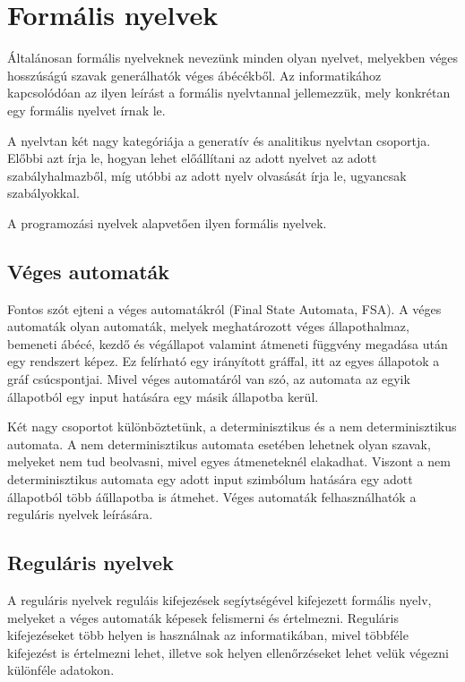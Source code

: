 
\section{Formális nyelvek}

Általánosan formális nyelveknek nevezünk minden olyan nyelvet, melyekben véges hosszúságú szavak generálhatók véges ábécékből. Az informatikához kapcsolódóan az ilyen leírást a formális nyelvtannal jellemezzük, mely konkrétan egy formális nyelvet írnak le.

A nyelvtan két nagy kategóriája a generatív és analitikus nyelvtan csoportja. Előbbi azt írja le, hogyan lehet előállítani az adott nyelvet az adott szabályhalmazből, míg utóbbi az adott nyelv olvasását írja le, ugyancsak szabályokkal.

A programozási nyelvek alapvetően ilyen formális nyelvek.

\subsection{Véges automaták}

Fontos szót ejteni a véges automatákról (Final State Automata, FSA). A véges automaták olyan automaták, melyek meghatározott véges állapothalmaz, bemeneti ábécé, kezdő és végállapot valamint átmeneti függvény megadása után egy rendszert képez. Ez felírható egy irányított gráffal, itt az egyes állapotok a gráf csúcspontjai. Mivel véges automatáról van szó, az automata az egyik állapotból egy input hatására egy másik állapotba kerül.

Két nagy csoportot különböztetünk, a determinisztikus és a nem determinisztikus automata. A nem determinisztikus automata esetében lehetnek olyan szavak, melyeket nem tud beolvasni, mivel egyes átmeneteknél elakadhat. Viszont a nem determinisztikus automata egy adott input szimbólum hatására egy adott állapotból több áűllapotba is átmehet. Véges automaták felhasználhatók a reguláris nyelvek leírására.

\subsection{Reguláris nyelvek}

A reguláris nyelvek reguláis kifejezések segíytségével kifejezett formális nyelv, melyeket a véges automaták képesek felismerni és értelmezni. Reguláris kifejezéseket több helyen is használnak az informatikában, mivel többféle kifejezést is értelmezni lehet, illetve sok helyen ellenőrzéseket lehet velük végezni különféle adatokon.

